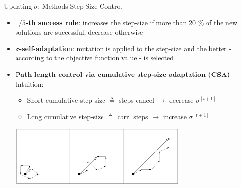 \documentclass[11pt,compress,t,notes=noshow, xcolor=table]{beamer}
\begin{document}
\begin{vbframe}{Updating $\sigma$: Methods Step-Size Control}
\begin{itemize}
\setlength\itemsep{1.0em}
\item \textbf{$1/5$-th success rule}: increases the step-size if more than 20 \% of the new solutions are successful, decrease otherwise
\item \textbf{$\sigma$-self-adaptation}: mutation is applied to the step-size and the better - according to the objective function value - is selected
\item \textbf{Path length control via cumulative step-size adaptation (CSA)}\\ Intuition:
\begin{itemize}
    \item Short cumulative step-size $\triangleq$ steps cancel $\to$ decrease $\sigma^{[t+1]}$ 
    \item Long cumulative step-size $\triangleq$ corr. steps $\to$ increase $\sigma^{[t+1]}$ 
\end{itemize}
\vspace{0.3cm}
\begin{center}
\includegraphics[width=0.7\textwidth]{figure_man/cmaes/cumulative-step-size.png}
\end{center}

\end{itemize}
\end{vbframe}
\end{document}
